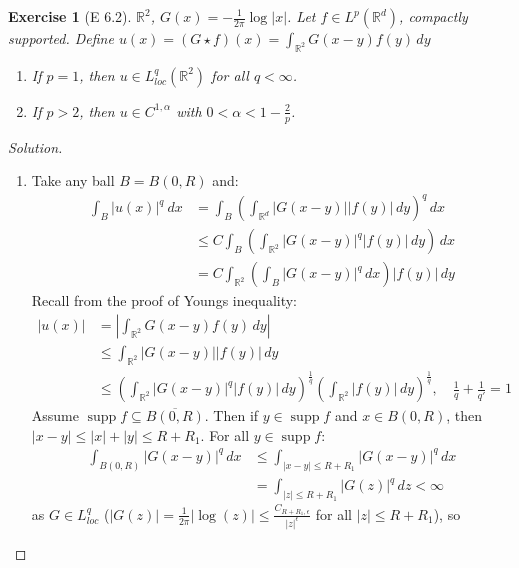 \documentclass{report}
\theoremstyle{tommy}
\newtheorem{ex}[defn]{Exercise}
\newcommand{\supp}{\operatorname{supp}}
\begin{document}
  \begin{ex}[E 6.2]
    \(\mathbb{R}^2\), \(G(x) = - \frac{1}{2 \pi} \log |x|\). Let \(f \in L^p(\mathbb{R}^d)\), compactly supported. Define \(u(x) =(G \star f)(x) = \int_{\mathbb{R}^2} G(x-y) f(y) \, dy\)
    \begin{enumerate}
      \item If \(p = 1\), then \(u \in L_{loc}^q(\mathbb{R}^2)\) for all \(q < \infty\).
      \item If \(p > 2\), then \(u \in C^{1, \alpha}\) with \(0 < \alpha < 1 - \frac{2}{p}\).
    \end{enumerate}
  \end{ex}

  \begin{proof}[Solution]
    \begin{enumerate}
      \item Take any ball \(B = B(0,R)\) and:
      \begin{align*}
        \int_B |u(x)|^q \ dx 
        &= \int_B \left(\int_{\mathbb{R}^d} |G(x-y)| |f(y)| \, dy\right)^q \, dx \\
        &\le C \int_{B} \left(\int_{\mathbb{R}^2} |G(x-y)|^q |f(y)| \, dy\right) \, dx  \\
        &= C \int_{\mathbb{R}^2} \left(\int_B |G(x-y)|^q \, dx\right) |f(y)| \, dy
      \end{align*}
      Recall from the proof of Youngs inequality:
      \begin{align*}
        |u(x)| &= \left| \int_{\mathbb{R}^2} G(x-y) f(y) \, dy \right| \\
        &\le \int_{\mathbb{R}^2} |G(x-y)||f(y)| \, dy \\
        &\le \left(\int_{\mathbb{R}^2} |G(x-y)|^q |f(y)| \, dy\right)^{\frac{1}{q}} \left(\int_{\mathbb{R}^2} |f(y)| \, dy\right)^{\frac{1}{q}}, \quad \frac{1}{q} + \frac{1}{q'} = 1
      \end{align*}
      Assume \(\supp f \subseteq \overline{B(0, R)}\). Then if \(y \in \supp f\) and \(x \in B(0,R)\), then \(|x-y| \le |x| + |y| \le R + R_1\). For all \(y \in \supp f\):
      \begin{align*}
        \int_{B(0, R)} |G(x-y)|^q \, dx
        &\le \int_{|x-y| \le R + R_1} |G(x-y)|^q \, dx \\
        &= \int_{|z| \le R + R_1} |G(z)|^q \, dz < \infty
      \end{align*}
      as \(G \in L_{loc}^q\) (\(|G(z)| = \frac{1}{2 \pi} |\log(z)| \le \frac{C_{R + R_1, \epsilon}}{|z|^\epsilon}\) for all \(|z| \le R + R_1\)), so 

\end{enumerate}
\end{proof}
\end{document}
